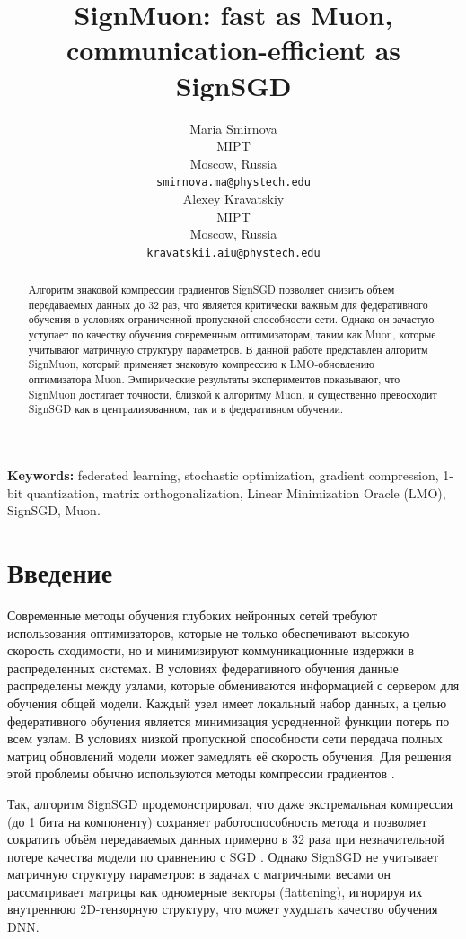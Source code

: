 \documentclass{article}
\title{SignMuon: fast as Muon, communication-efficient as SignSGD}
\author{
  Maria Smirnova\\
  MIPT\\
  Moscow, Russia\\
  \texttt{smirnova.ma@phystech.edu}\\
  \And
  Alexey Kravatskiy \\
  MIPT\\
  Moscow, Russia\\
  \texttt{kravatskii.aiu@phystech.edu}\\
}
\begin{document}
\maketitle

\begin{abstract}
Алгоритм знаковой компрессии градиентов SignSGD позволяет снизить объем передаваемых данных до 32 раз, что является критически важным для федеративного обучения в условиях ограниченной пропускной способности сети. Однако он зачастую уступает по качеству обучения современным оптимизаторам, таким как Muon, которые учитывают матричную структуру параметров. В данной работе представлен алгоритм SignMuon, который применяет знаковую компрессию к LMO-обновлению оптимизатора Muon. Эмпирические результаты экспериментов показывают, что SignMuon достигает точности, близкой к алгоритму Muon, и существенно превосходит SignSGD как в централизованном, так и в федеративном обучении.
    
\end{abstract}

\textbf{Keywords:} federated learning, stochastic optimization, gradient compression, 1-bit quantization, matrix orthogonalization, Linear Minimization Oracle (LMO), SignSGD, Muon.


\section{Введение}\label{sec:intro}
Современные методы обучения глубоких нейронных сетей требуют использования оптимизаторов, которые не только обеспечивают высокую скорость сходимости, но и минимизируют коммуникационные издержки в распределенных системах. В условиях федеративного обучения данные распределены между узлами, которые обмениваются информацией с сервером для обучения общей модели. Каждый узел имеет локальный набор данных, а целью федеративного обучения является минимизация усредненной функции потерь по всем узлам. В условиях низкой пропускной способности сети передача полных матриц обновлений модели может замедлять её скорость обучения. Для решения этой проблемы обычно используются методы компрессии градиентов \cite{bernstein2018signsgd,  bernstein2019signsgdmajority, beznosikov2020biased}. 

Так, алгоритм SignSGD продемонстрировал, что даже экстремальная компрессия (до 1 бита на компоненту) сохраняет работоспособность метода и позволяет сократить объём передаваемых данных примерно в 32 раза при незначительной потере качества модели по сравнению с SGD \cite{bernstein2018signsgd, bernstein2019signsgdmajority}. Однако SignSGD не учитывает матричную структуру параметров: в задачах с матричными весами он рассматривает матрицы как одномерные векторы (flattening), игнорируя их внутреннюю 2D-тензорную структуру, что может ухудшать качество обучения DNN. 
\end{document}
